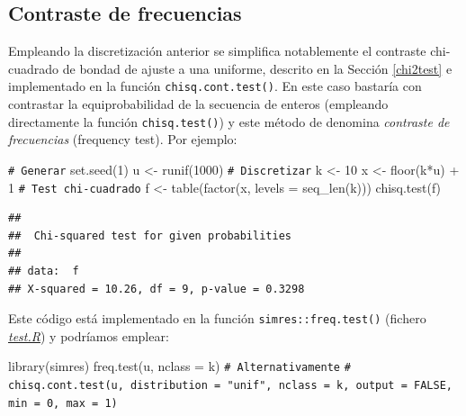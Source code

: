 \documentclass[
]{book}
\newenvironment{Shaded}{\begin{snugshade}}{\end{snugshade}}
\newcommand{\AttributeTok}[1]{\textcolor[rgb]{0.77,0.63,0.00}{#1}}
\newcommand{\CommentTok}[1]{\textcolor[rgb]{0.56,0.35,0.01}{\textit{#1}}}
\newcommand{\DecValTok}[1]{\textcolor[rgb]{0.00,0.00,0.81}{#1}}
\newcommand{\FunctionTok}[1]{\textcolor[rgb]{0.00,0.00,0.00}{#1}}
\newcommand{\NormalTok}[1]{#1}
\newcommand{\OtherTok}[1]{\textcolor[rgb]{0.56,0.35,0.01}{#1}}
\newcommand{\SpecialCharTok}[1]{\textcolor[rgb]{0.00,0.00,0.00}{#1}}
\theoremstyle{break}
\theoremstyle{nonumberplain}
\renewcommand{\CommentTok}[1]{\textcolor[rgb]{0.41,0.41,0.41}{\texttt{#1}}}
\begin{document}
\hypertarget{freq-test}{%
\subsection{Contraste de frecuencias}\label{freq-test}}

Empleando la discretización anterior se simplifica notablemente el contraste chi-cuadrado de bondad de ajuste a una uniforme, descrito en la Sección \ref{chi2test} e implementado en la función \texttt{chisq.cont.test()}.
En este caso bastaría con contrastar la equiprobabilidad de la secuencia de enteros (empleando directamente la función \texttt{chisq.test()}) y este método de denomina \emph{contraste de frecuencias} (frequency test).
Por ejemplo:

\begin{Shaded}
\begin{Highlighting}[]
\CommentTok{\# Generar}
\FunctionTok{set.seed}\NormalTok{(}\DecValTok{1}\NormalTok{)}
\NormalTok{u }\OtherTok{\textless{}{-}} \FunctionTok{runif}\NormalTok{(}\DecValTok{1000}\NormalTok{)}
\CommentTok{\# Discretizar}
\NormalTok{k }\OtherTok{\textless{}{-}} \DecValTok{10}
\NormalTok{x }\OtherTok{\textless{}{-}} \FunctionTok{floor}\NormalTok{(k}\SpecialCharTok{*}\NormalTok{u) }\SpecialCharTok{+} \DecValTok{1}
\CommentTok{\# Test chi{-}cuadrado}
\NormalTok{f }\OtherTok{\textless{}{-}} \FunctionTok{table}\NormalTok{(}\FunctionTok{factor}\NormalTok{(x, }\AttributeTok{levels =} \FunctionTok{seq\_len}\NormalTok{(k)))}
\FunctionTok{chisq.test}\NormalTok{(f)}
\end{Highlighting}
\end{Shaded}

\begin{verbatim}
## 
##  Chi-squared test for given probabilities
## 
## data:  f
## X-squared = 10.26, df = 9, p-value = 0.3298
\end{verbatim}

Este código está implementado en la función \texttt{simres::freq.test()} (fichero \href{R/test.R}{\emph{test.R}}) y podríamos emplear:

\begin{Shaded}
\begin{Highlighting}[]
\FunctionTok{library}\NormalTok{(simres)}
\FunctionTok{freq.test}\NormalTok{(u, }\AttributeTok{nclass =}\NormalTok{ k)}
\CommentTok{\# Alternativamente}
\CommentTok{\# chisq.cont.test(u, distribution = "unif", nclass = k, output = FALSE, min = 0, max = 1)}
\end{Highlighting}
\end{Shaded}
\end{document}
